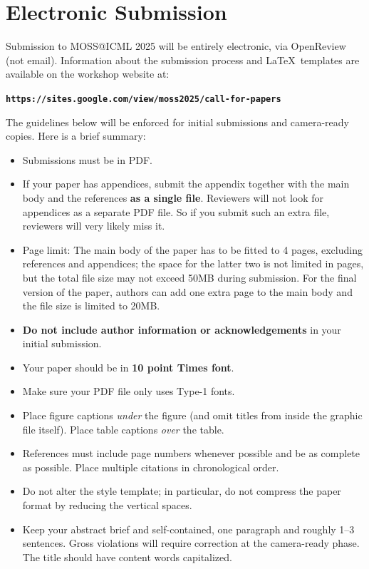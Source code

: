 \documentclass{article}
\theoremstyle{plain}
\theoremstyle{definition}
\theoremstyle{remark}
\begin{document}
\printAffiliationsAndNotice{\icmlEqualContribution} %

\begin{abstract}
This document provides a basic paper template and submission guidelines.
Abstracts must be a single paragraph, ideally between 1--3 sentences long.
\end{abstract}

\section{Electronic Submission}
\label{submission}

Submission to MOSS@ICML 2025 will be entirely electronic, via OpenReview
(not email). Information about the submission process and \LaTeX\ templates
are available on the workshop website at:
\begin{center}
\textbf{\texttt{https://sites.google.com/view/moss2025/call-for-papers}}
\end{center}

The guidelines below will be enforced for initial submissions and
camera-ready copies. Here is a brief summary:
\begin{itemize}
\item Submissions must be in PDF\@. 
\item If your paper has appendices, submit the appendix together with the main body and the references \textbf{as a single file}. Reviewers will not look for appendices as a separate PDF file. So if you submit such an extra file, reviewers will very likely miss it.
\item Page limit: The main body of the paper has to be fitted to 4 pages, excluding references and appendices; the space for the latter two is not limited in pages, but the total file size may not exceed 50MB during submission. For the final version of the paper, authors can add one extra page to the main body and the file size is limited to 20MB.
\item \textbf{Do not include author information or acknowledgements} in your
    initial submission.
\item Your paper should be in \textbf{10 point Times font}.
\item Make sure your PDF file only uses Type-1 fonts.
\item Place figure captions \emph{under} the figure (and omit titles from inside
    the graphic file itself). Place table captions \emph{over} the table.
\item References must include page numbers whenever possible and be as complete
    as possible. Place multiple citations in chronological order.
\item Do not alter the style template; in particular, do not compress the paper
    format by reducing the vertical spaces.
\item Keep your abstract brief and self-contained, one paragraph and roughly
    1--3 sentences. Gross violations will require correction at the
    camera-ready phase. The title should have content words capitalized.
\end{itemize}
\end{document}

